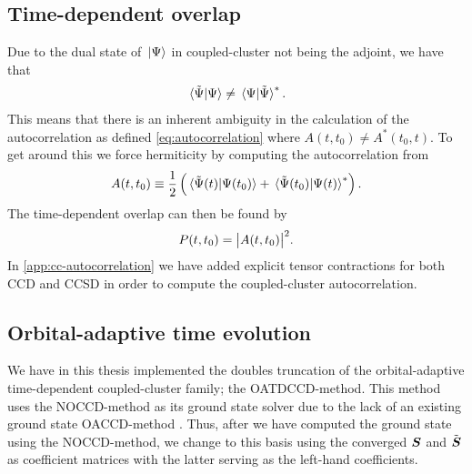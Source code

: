         \subsection{Time-dependent overlap}
            Due to the dual state of $\ket*{\Psi}$ in coupled-cluster not being
            the adjoint, we have that
            \begin{align}
                \braket*{\tilde{\Psi}}{\Psi}
                \neq \braket*{\Psi}{\tilde{\Psi}}^{*}.
            \end{align}
            This means that there is an inherent ambiguity in the calculation of
            the autocorrelation as defined \autoref{eq:autocorrelation} where
            $A(t, t_0) \neq A^{*}(t_0, t)$.
            To get around this we force hermiticity by computing the
            autocorrelation from \cite{pedersen2018symplectic}
            \begin{align}
                A(t, t_0)
                \equiv \frac{1}{2}\left( 
                    \braket*{\tilde{\Psi}(t)}{\Psi(t_0)}
                    + \braket*{\tilde{\Psi}(t_0)}{\Psi(t)}^{*}
                 \right).
            \end{align}
            The time-dependent overlap can then be found by
            \begin{align}
                P(t, t_0)
                = \abs{A(t, t_0)}^2.
            \end{align}
            In \autoref{app:cc-autocorrelation} we have added explicit tensor
            contractions for both CCD and CCSD in order to compute the
            coupled-cluster autocorrelation.

        \subsection{Orbital-adaptive time evolution}
            \label{subsec:oatdcc-implementation}
            We have in this thesis implemented the doubles truncation of the
            orbital-adaptive time-dependent coupled-cluster family; the
            OATDCCD-method.
            This method uses the NOCCD-method as its ground state solver due to
            the lack of an existing ground state OACCD-method
            \cite{kvaal2012ab}.
            Thus, after we have computed the ground state using the
            NOCCD-method, we change to this basis using the converged $\boldsymbol{S}$
            and $\tilde{\boldsymbol{S}}$ as coefficient matrices with the latter
            serving as the left-hand coefficients.

